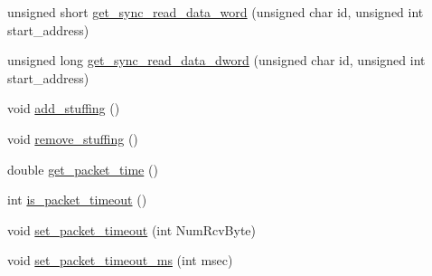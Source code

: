 \begin{DoxyCompactItemize}
\item 
unsigned short \hyperlink{classdynamixel2_a5afed0047167b1a4262d7fb961faa488}{get\+\_\+sync\+\_\+read\+\_\+data\+\_\+word} (unsigned char id, unsigned int start\+\_\+address)
\item 
unsigned long \hyperlink{classdynamixel2_a4f25408bacde5a8a3b00b2f7f79f0202}{get\+\_\+sync\+\_\+read\+\_\+data\+\_\+dword} (unsigned char id, unsigned int start\+\_\+address)
\item 
void \hyperlink{classdynamixel2_a350920b911d0ad2116b91f2149b840c7}{add\+\_\+stuffing} ()
\item 
void \hyperlink{classdynamixel2_a910c7b80ace3a816641468b32c0290a6}{remove\+\_\+stuffing} ()
\item 
double \hyperlink{classdynamixel2_a7d4d98424dc85511970e9a405b919594}{get\+\_\+packet\+\_\+time} ()
\item 
int \hyperlink{classdynamixel2_a4c996c0d9edcfd320906674512837a9e}{is\+\_\+packet\+\_\+timeout} ()
\item 
void \hyperlink{classdynamixel2_a132d723a321ba225f75f2c79e5d4d27b}{set\+\_\+packet\+\_\+timeout} (int Num\+Rcv\+Byte)
\item 
void \hyperlink{classdynamixel2_a7d85d44aa6c1fe51f952f395a79296d5}{set\+\_\+packet\+\_\+timeout\+\_\+ms} (int msec)
\end{DoxyCompactItemize}
